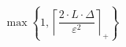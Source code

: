 \[\max\left\{ 1, \left\lceil \frac{2 \cdot L \cdot \Delta}{\varepsilon^{2}} \right\rceil_{+} \right\}\]
